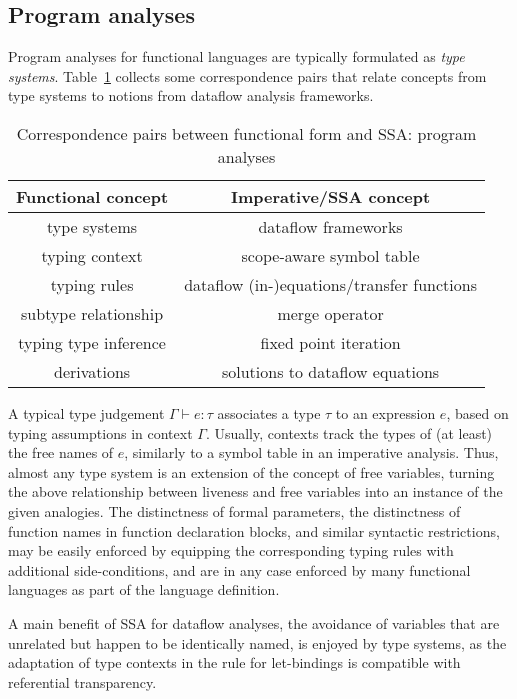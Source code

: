 \subsection{Program analyses}
Program analyses for functional languages are typically formulated as
\emph{type systems}. Table~\ref{tableFunctionalCorrespondencesII} collects some
correspondence pairs that relate concepts from type systems to notions
from dataflow analysis frameworks.
\begin{table}
\begin{center}
\begin{tabular}{|c|c|}
  \hline Functional concept & Imperative/SSA concept\\ 
  \hline
  type systems & dataflow frameworks\\
  typing context & scope-aware symbol table\\
  typing
  rules & dataflow (in-)equations/transfer functions\\
  subtype relationship & merge operator\\
  typing
  type inference & fixed point iteration\\
  derivations & solutions to dataflow equations\\
  \hline
\end{tabular}
\end{center}
\caption{\label{tableFunctionalCorrespondencesII}
  Correspondence pairs between functional form and SSA: program analyses}
\end{table}
 A typical type judgement $\Gamma
\vdash e:\tau$ 
associates a type $\tau$ to an expression $e$, based on typing
assumptions in context $\Gamma$. Usually, contexts track the types of
(at least) the free names of $e$, similarly to a symbol table in an
imperative analysis. Thus, almost any type system is an extension of
the concept of free variables, turning the above relationship between
liveness and free variables into an instance of the given
analogies. The distinctness of formal parameters, the distinctness of
function names in function declaration blocks, and similar syntactic
restrictions, may be easily enforced by equipping the corresponding
typing rules with additional side-conditions, and are in any case
enforced by many functional languages as part of the language
definition.

A main benefit of SSA for dataflow analyses, the avoidance of
variables that are unrelated but happen to be identically named, is
enjoyed by type systems, as the adaptation of type contexts in the rule
for let-bindings is compatible with referential transparency.

